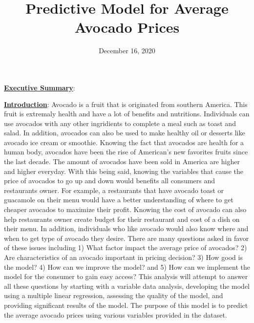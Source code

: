 \documentclass[11pt]{article}\usepackage[]{graphicx}\usepackage[]{color}
\title{Predictive Model for Average Avocado Prices\vspace{-5ex}}
\date{December 16, 2020\vspace{-5ex}}
\begin{document}
 
\maketitle
\hfill \break
















\noindent\textbf{\underline{Executive Summary}}:      
\hfill \break

\noindent\textbf{\underline{Introduction}}: Avocado is a fruit that is originated from southern America. This fruit is extremaly health and have a lot of benefits and nutritions. Individuals can use avocados with any other ingridients to complete a meal such as toast and salad. In addition, avocados can also be used to make healthy oil or desserts like avocado ice cream or smoothie. Knowing the fact that avocados are health for a human body, avocados have been the rise of American's new favorites fruits since the last decade. The amount of avocados have been sold in America are higher and higher everyday. With this being said, knowing the variables that cause the price of avocados to go up and down would benefits all consumers and restaurants owner. For example, a restaurants that have avocado toast or guacamole on their menu would have a better understanding of where to get cheaper avocados to maximize their profit. Knowing the cost of avocado can also help restaurants owner create budget for their restaurant and cost of a dish on their menu. In addition, individuals who like avocado would also know where and when to get type of avocado they desire. There are many questions asked in favor of these issues including 1) What factor impact the average price of avocados? 2) Are characteristics of an avocado important in pricing decision? 3) How good is the model? 4) How can we improve the model? and 5) How can we implement the model for the consumer to gain easy access? This analysis will attempt to answer all these questions by starting with a variable data analysis, developing the model using a multiple linear regression, assessing the quality of the model, and providing significant results of the model. The purpose of this model is to predict the average avocado prices using various variables provided in the dataset.         
\hfill \break
\end{document}
